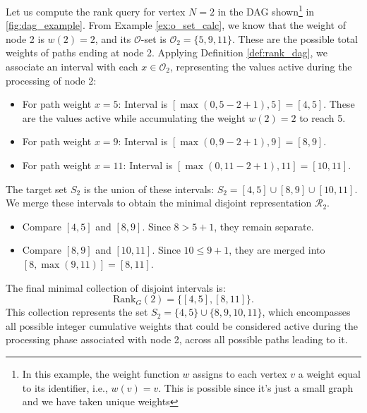 \begin{example}
    \label{ex:rank_calc_disjoint}
    Let us compute the rank query for vertex $N=2$ in the DAG shown\footnote{In this example, the weight function $w$ assigns to each vertex $v$ a weight equal to its identifier, i.e., $w(v)=v$. This is possible since it's just a small graph and we have taken unique weights} in \autoref{fig:dag_example}. From Example \ref{ex:o_set_calc}, we know that the weight of node 2 is $w(2) = 2$, and its $\mathcal{O}$-set is $\mathcal{O}_2 = \{ 5, 9, 11 \}$. These are the possible total weights of paths ending at node 2.
    Applying Definition \ref{def:rank_dag}, we associate an interval with each $x \in \mathcal{O}_2$, representing the values active during the processing of node 2:
    \begin{itemize}
        \item For path weight $x=5$: Interval is $[\max(0, 5 - 2 + 1), 5] = [4, 5]$. These are the values active while accumulating the weight $w(2)=2$ to reach 5.
        \item For path weight $x=9$: Interval is $[\max(0, 9 - 2 + 1), 9] = [8, 9]$.
        \item For path weight $x=11$: Interval is $[\max(0, 11 - 2 + 1), 11] = [10, 11]$.
    \end{itemize}
    The target set $S_2$ is the union of these intervals: $S_2 = [4, 5] \cup [8, 9] \cup [10, 11]$.
    We merge these intervals to obtain the minimal disjoint representation $\mathcal{R}_2$.
    \begin{itemize}
        \item Compare $[4, 5]$ and $[8, 9]$. Since $8 > 5 + 1$, they remain separate.
        \item Compare $[8, 9]$ and $[10, 11]$. Since $10 \le 9 + 1$, they are merged into $[8, \max(9, 11)] = [8, 11]$.
    \end{itemize}
    The final minimal collection of disjoint intervals is:
    \[ \mathrm{Rank}_G(2) = \{ [4, 5], [8, 11] \}. \]
    This collection represents the set $S_2 = \{4, 5\} \cup \{8, 9, 10, 11\}$, which encompasses all possible integer cumulative weights that could be considered active during the processing phase associated with node 2, across all possible paths leading to it.
\end{example}
